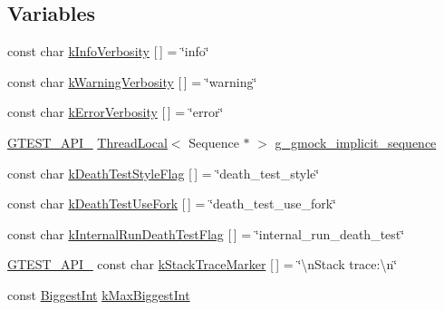 \subsection*{Variables}
\begin{DoxyCompactItemize}
\item 
const char \mbox{\hyperlink{namespacetesting_1_1internal_a96274a788ffc75a6dffdfa8aa1f34fb9}{k\+Info\+Verbosity}} \mbox{[}$\,$\mbox{]} = \char`\"{}info\char`\"{}
\item 
const char \mbox{\hyperlink{namespacetesting_1_1internal_ad9386ccda6b6deac2f7b84784d3088c0}{k\+Warning\+Verbosity}} \mbox{[}$\,$\mbox{]} = \char`\"{}warning\char`\"{}
\item 
const char \mbox{\hyperlink{namespacetesting_1_1internal_a3d730761274e7b80dd66e5014171fcb5}{k\+Error\+Verbosity}} \mbox{[}$\,$\mbox{]} = \char`\"{}error\char`\"{}
\item 
\mbox{\hyperlink{gtest-port_8h_aa73be6f0ba4a7456180a94904ce17790}{G\+T\+E\+S\+T\+\_\+\+A\+P\+I\+\_\+}} \mbox{\hyperlink{classtesting_1_1internal_1_1ThreadLocal}{Thread\+Local}}$<$ Sequence $\ast$ $>$ \mbox{\hyperlink{namespacetesting_1_1internal_a1b1f8431e32fe7315e218986de3920b8}{g\+\_\+gmock\+\_\+implicit\+\_\+sequence}}
\item 
const char \mbox{\hyperlink{namespacetesting_1_1internal_a008ebfe0c0347d65e5e06e4d310981b3}{k\+Death\+Test\+Style\+Flag}} \mbox{[}$\,$\mbox{]} = \char`\"{}death\+\_\+test\+\_\+style\char`\"{}
\item 
const char \mbox{\hyperlink{namespacetesting_1_1internal_a32051e2574562b548be3e26a52eaa553}{k\+Death\+Test\+Use\+Fork}} \mbox{[}$\,$\mbox{]} = \char`\"{}death\+\_\+test\+\_\+use\+\_\+fork\char`\"{}
\item 
const char \mbox{\hyperlink{namespacetesting_1_1internal_a8572303d929880adf30db00952e1c45d}{k\+Internal\+Run\+Death\+Test\+Flag}} \mbox{[}$\,$\mbox{]} = \char`\"{}internal\+\_\+run\+\_\+death\+\_\+test\char`\"{}
\item 
\mbox{\hyperlink{gtest-port_8h_aa73be6f0ba4a7456180a94904ce17790}{G\+T\+E\+S\+T\+\_\+\+A\+P\+I\+\_\+}} const char \mbox{\hyperlink{namespacetesting_1_1internal_abb38528ca6a45df265b19f5ccb3d16d9}{k\+Stack\+Trace\+Marker}} \mbox{[}$\,$\mbox{]} = \char`\"{}\textbackslash{}n\+Stack trace\+:\textbackslash{}n\char`\"{}
\item 
const \mbox{\hyperlink{namespacetesting_1_1internal_a05c6bd9ede5ccdf25191a590d610dcc6}{Biggest\+Int}} \mbox{\hyperlink{namespacetesting_1_1internal_ad901880198832bc166d2493096b451f7}{k\+Max\+Biggest\+Int}}

\end{DoxyCompactItemize}
